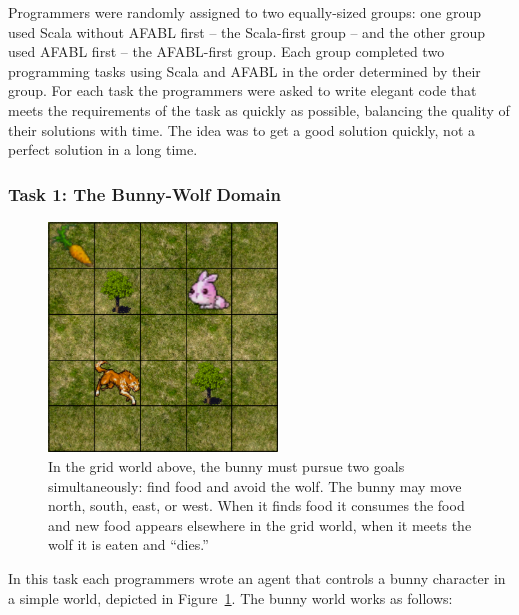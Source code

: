 Programmers were randomly assigned to two equally-sized groups: one group used Scala without AFABL first -- the Scala-first group -- and the other group used AFABL first -- the AFABL-first group.  Each group completed two programming tasks using Scala and AFABL in the order determined by their group.  For each task the programmers were asked to write elegant code that meets the requirements of the task as quickly as possible, balancing the quality of their solutions with time.  The idea was to get a good solution quickly, not a perfect solution in a long time.

\subsubsection{Task 1: The Bunny-Wolf Domain}\label{sec:task1}

\begin{figure}[h]

\begin{center}
\includegraphics[height=2.4in]{bunny.png}
\end{center}


\caption{In the grid world above, the bunny must pursue two goals simultaneously: find food and avoid the wolf.  The bunny may move north, south, east, or west.  When it finds food it consumes the food and new food appears elsewhere in the grid world, when it meets the wolf it is eaten and ``dies.''}
\label{fig:bunny-picture}
\end{figure}

In this task each programmers wrote an agent that controls a bunny character in a simple world, depicted in Figure~\ref{fig:bunny-picture}.  The bunny world works as follows:

